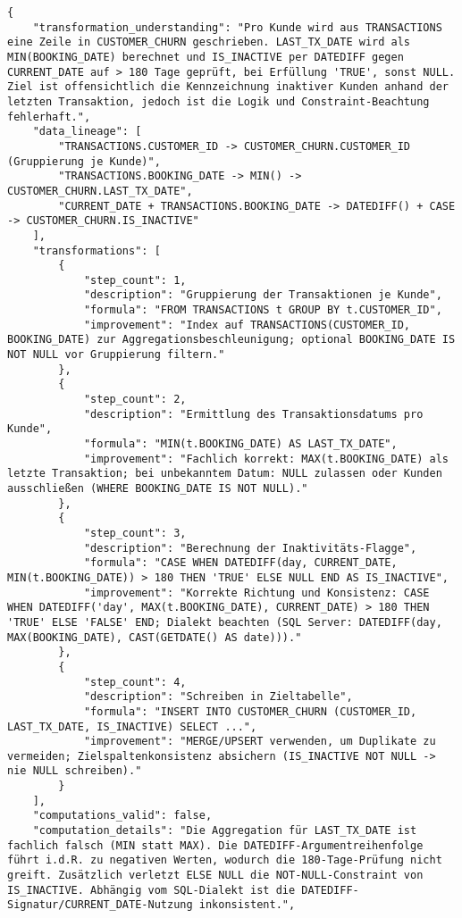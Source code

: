 \begin{lstlisting}[caption={Ausgabe: GPT-5 Anwendungsfall 7 Robustheitsdurchlauf},label={gpt_case7_prompt3}]
{
    "transformation_understanding": "Pro Kunde wird aus TRANSACTIONS eine Zeile in CUSTOMER_CHURN geschrieben. LAST_TX_DATE wird als MIN(BOOKING_DATE) berechnet und IS_INACTIVE per DATEDIFF gegen CURRENT_DATE auf > 180 Tage geprüft, bei Erfüllung 'TRUE', sonst NULL. Ziel ist offensichtlich die Kennzeichnung inaktiver Kunden anhand der letzten Transaktion, jedoch ist die Logik und Constraint-Beachtung fehlerhaft.",
    "data_lineage": [
        "TRANSACTIONS.CUSTOMER_ID -> CUSTOMER_CHURN.CUSTOMER_ID (Gruppierung je Kunde)",
        "TRANSACTIONS.BOOKING_DATE -> MIN() -> CUSTOMER_CHURN.LAST_TX_DATE",
        "CURRENT_DATE + TRANSACTIONS.BOOKING_DATE -> DATEDIFF() + CASE -> CUSTOMER_CHURN.IS_INACTIVE"
    ],
    "transformations": [
        {
            "step_count": 1,
            "description": "Gruppierung der Transaktionen je Kunde",
            "formula": "FROM TRANSACTIONS t GROUP BY t.CUSTOMER_ID",
            "improvement": "Index auf TRANSACTIONS(CUSTOMER_ID, BOOKING_DATE) zur Aggregationsbeschleunigung; optional BOOKING_DATE IS NOT NULL vor Gruppierung filtern."
        },
        {
            "step_count": 2,
            "description": "Ermittlung des Transaktionsdatums pro Kunde",
            "formula": "MIN(t.BOOKING_DATE) AS LAST_TX_DATE",
            "improvement": "Fachlich korrekt: MAX(t.BOOKING_DATE) als letzte Transaktion; bei unbekanntem Datum: NULL zulassen oder Kunden ausschließen (WHERE BOOKING_DATE IS NOT NULL)."
        },
        {
            "step_count": 3,
            "description": "Berechnung der Inaktivitäts-Flagge",
            "formula": "CASE WHEN DATEDIFF(day, CURRENT_DATE, MIN(t.BOOKING_DATE)) > 180 THEN 'TRUE' ELSE NULL END AS IS_INACTIVE",
            "improvement": "Korrekte Richtung und Konsistenz: CASE WHEN DATEDIFF('day', MAX(t.BOOKING_DATE), CURRENT_DATE) > 180 THEN 'TRUE' ELSE 'FALSE' END; Dialekt beachten (SQL Server: DATEDIFF(day, MAX(BOOKING_DATE), CAST(GETDATE() AS date)))."
        },
        {
            "step_count": 4,
            "description": "Schreiben in Zieltabelle",
            "formula": "INSERT INTO CUSTOMER_CHURN (CUSTOMER_ID, LAST_TX_DATE, IS_INACTIVE) SELECT ...",
            "improvement": "MERGE/UPSERT verwenden, um Duplikate zu vermeiden; Zielspaltenkonsistenz absichern (IS_INACTIVE NOT NULL -> nie NULL schreiben)."
        }
    ],
    "computations_valid": false,
    "computation_details": "Die Aggregation für LAST_TX_DATE ist fachlich falsch (MIN statt MAX). Die DATEDIFF-Argumentreihenfolge führt i.d.R. zu negativen Werten, wodurch die 180-Tage-Prüfung nicht greift. Zusätzlich verletzt ELSE NULL die NOT-NULL-Constraint von IS_INACTIVE. Abhängig vom SQL-Dialekt ist die DATEDIFF-Signatur/CURRENT_DATE-Nutzung inkonsistent.",

\end{lstlisting}
